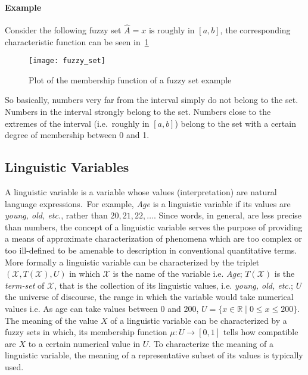 \documentclass[]{article}
\begin{document}
\paragraph{Example} Consider the following fuzzy set
$ \hat{A} = x \text{ is roughly in }[a, b] $,
the corresponding characteristic function can be seen in~\ref{fig:fuzzyset}\\
\begin{figure}[ht!]
  \centering
  \texttt{[image: fuzzy\_set]}
  \caption{Plot of the membership function of a fuzzy set example\label{fig:fuzzyset}}
\end{figure}

So basically, numbers very far from the interval simply do not belong to the set.
Numbers in the interval strongly belong to the set. Numbers close to the extremes
of the interval (i.e.\ roughly in $[a, b]$) belong to the set with a certain degree
of membership between 0 and 1.

\subsection{Linguistic Variables~\citep{Zadeh1975}}
A linguistic variable is a variable whose values (interpretation) are natural
language expressions.~For example, \textit{Age} is a linguistic variable if its
values are \textit{young, old, etc.}, rather than $20, 21, 22, \dots$.
Since words, in general, are less precise than numbers, the concept of a
linguistic variable serves the purpose of providing a means of approximate
characterization of phenomena which are too complex or too ill-defined to be
amenable to description in conventional quantitative terms. \\
More formally a linguistic variable can be characterized by the triplet
$(\mathscr{X}, T(\mathscr{X}), U)$ in which $\mathscr{X}$ is the name of
the variable i.e. \textit{Age}; $T(\mathscr{X})$ is the \textit{term-set} of
$\mathscr{X}$, that is the collection of its linguistic values, i.e.
\textit{young, old, etc.}; $U$ the universe of discourse, the range in
which the variable would take numerical values i.e. As age can take
values between 0 and 200, $U = \{x \in \mathbb{R} \mid 0\leq x\leq 200\}$.\\
The meaning of the value $X$ of a linguistic variable can be characterized by
a fuzzy sets in which, its membership function $\mu: U\to [0, 1]$ tells how
compatible are $X$ to a certain numerical value in $U$. To characterize the
meaning of a linguistic variable, the meaning of a representative subset of its
values is typically used.
\end{document}
